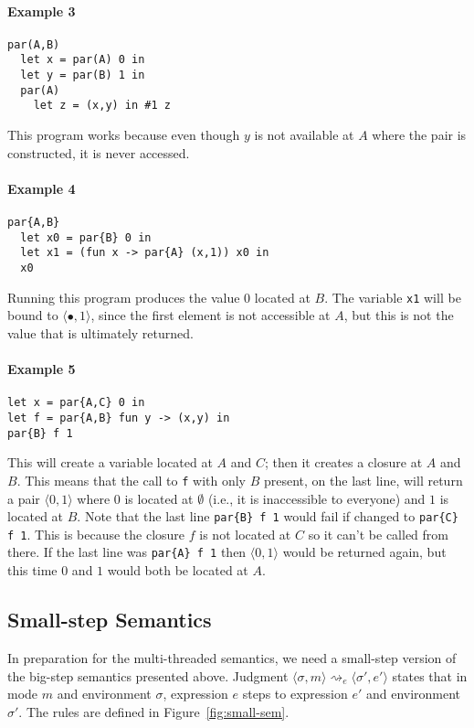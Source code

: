 \documentclass[10pt]{article}
\newcommand{\epair}[2]{\ensuremath{\langle {#1}, {#2} \rangle}}
\newcommand{\vcrash}{\ensuremath{\bullet}}
\newcommand{\seval}[5]{\ensuremath{\config{#1}{#3} \rightsquigarrow_{#2} \config{#4}{#5}}}
\newcommand{\env}{\ensuremath{\sigma}}
\newcommand{\config}[2]{\ensuremath{\langle{#1},{#2}\rangle}}
\begin{document}
\paragraph{Example 3}
\begin{verbatim}
par(A,B) 
  let x = par(A) 0 in
  let y = par(B) 1 in
  par(A) 
    let z = (x,y) in #1 z
\end{verbatim}
This program works because even though $y$ is not available at $A$
where the pair is constructed, it is never accessed.

\paragraph{Example 4}
\begin{verbatim}
par{A,B}
  let x0 = par{B} 0 in
  let x1 = (fun x -> par{A} (x,1)) x0 in
  x0
\end{verbatim}
Running this program produces the value $0$ located at $B$. The
variable \texttt{x1} will be bound to $\epair{\vcrash}{1}$, since the
first element is not accessible at $A$, but this is not the value that
is ultimately returned.

\paragraph{Example 5}
\begin{verbatim}
let x = par{A,C} 0 in
let f = par{A,B} fun y -> (x,y) in
par{B} f 1
\end{verbatim}
This will create a variable located at $A$ and $C$; then it creates a
closure at $A$ and $B$. This means that the call to \texttt{f} with
only $B$ present, on the last line, will return a pair $\epair{0}{1}$
where $0$ is located at $\emptyset$ (i.e., it is inaccessible to
everyone) and $1$ is located at $B$. Note that the last line
\texttt{par\{B\} f 1} would fail if changed to \texttt{par\{C\} f
  1}. This is because the closure $f$ is not located at $C$ so it
can't be called from there. If the last line was \texttt{par\{A\} f 1}
then $\epair{0}{1}$ would be returned again, but this time $0$ and $1$
would both be located at $A$.

\subsection{Small-step Semantics}

In preparation for the multi-threaded semantics, we need a small-step
version of the big-step semantics presented above. Judgment
$\seval{\env}{e}{m}{\env'}{e'}$ states that in mode $m$ and
environment $\env$, expression $e$ steps to expression $e'$ and
environment $\env'$. The rules are defined in
Figure~\ref{fig:small-sem}. 
\end{document}
